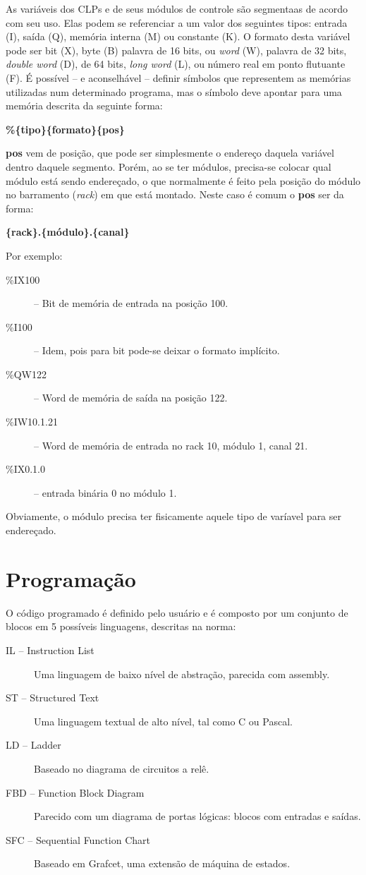 As variáveis dos CLPs e de seus módulos de controle são segmentaas de acordo com seu uso. Elas podem se referenciar a um valor dos seguintes tipos: entrada (I), saída (Q), memória interna (M) ou constante (K). O formato desta variável pode ser bit (X), byte (B) palavra de 16 bits, ou \emph{word} (W), palavra de 32 bits, \emph{double word} (D), de 64 bits, \emph{long word} (L),  ou número real em ponto flutuante (F). É possível -- e aconselhável -- definir símbolos que representem as memórias utilizadas num determinado programa, mas o símbolo deve apontar para uma memória descrita da seguinte forma:
\begin{center}
\textbf{\%\{tipo\}\{formato\}\{pos\}}
\end{center}

\textbf{pos} vem de posição, que pode ser simplesmente o endereço daquela variável dentro daquele segmento. Porém, ao se ter módulos, precisa-se colocar qual módulo está sendo endereçado, o que normalmente é feito pela posição do módulo no barramento (\emph{rack}) em que está montado. Neste caso é comum o \textbf{pos} ser da forma:
\begin{center}
\textbf{\{rack\}.\{módulo\}.\{canal\}}
\end{center}

Por exemplo:

\begin{description}
  \item[\%IX100] -- Bit de memória de entrada na posição 100.
  \item[\%I100] -- Idem, pois para bit pode-se deixar o formato implícito.
  \item[\%QW122] -- Word de memória de saída na posição 122.
  \item[\%IW10.1.21] -- Word de memória de entrada no rack 10, módulo 1, canal 21.
  \item[\%IX0.1.0] -- entrada binária 0 no módulo 1.
\end{description}

Obviamente, o módulo precisa ter fisicamente aquele tipo de varíavel para ser endereçado.

\section{Programação}
O código programado é definido pelo usuário e é composto por um conjunto de blocos em 5 possíveis linguagens, descritas na norma:
\begin{description}
  \item[IL -- Instruction List] Uma linguagem de baixo nível de abstração, parecida com assembly.
  \item[ST -- Structured Text] Uma linguagem textual de alto nível, tal como C ou Pascal.
  \item[LD -- Ladder] Baseado no diagrama de circuitos a relê.
  \item[FBD -- Function Block Diagram] Parecido com um diagrama de portas lógicas: blocos com entradas e saídas.
  \item[SFC -- Sequential Function Chart] Baseado em Grafcet, uma extensão de máquina de estados.
\end{description}

